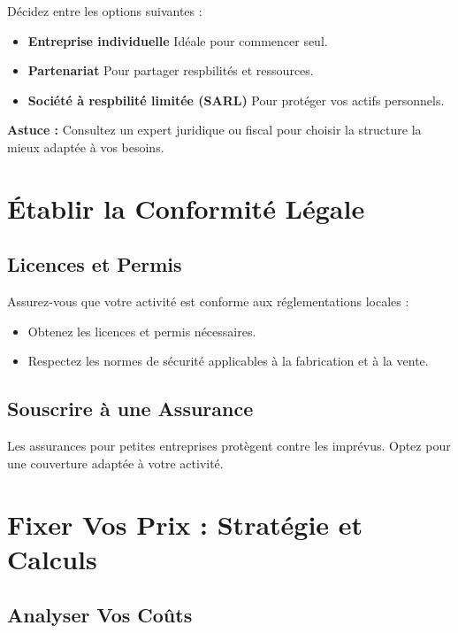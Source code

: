 \documentclass[11pt,fleqn,onecolumn,oneside]{book}
\begin{document}
Décidez entre les options suivantes :
\begin{itemize}
    \item \textbf{Entreprise individuelle} Idéale pour commencer seul.
    \item \textbf{Partenariat} Pour partager respbilités et ressources.
    \item \textbf{Société à respbilité limitée (SARL)} Pour protéger vos actifs personnels.
\end{itemize}

\begin{remark}
\textbf{Astuce :} Consultez un expert juridique ou fiscal pour choisir la structure la mieux adaptée à vos besoins.
\end{remark}

\section{Établir la Conformité Légale}

\subsection*{Licences et Permis}

Assurez-vous que votre activité est conforme aux réglementations locales :
\begin{itemize}
    \item Obtenez les licences et permis nécessaires.
    \item Respectez les normes de sécurité applicables à la fabrication et à la vente.
\end{itemize}

\subsection*{Souscrire à une Assurance}

\begin{remark}
Les assurances pour petites entreprises protègent contre les imprévus. Optez pour une couverture adaptée à votre activité.
\end{remark}

\section{Fixer Vos Prix : Stratégie et Calculs}

\subsection*{Analyser Vos Coûts}
\end{document}
